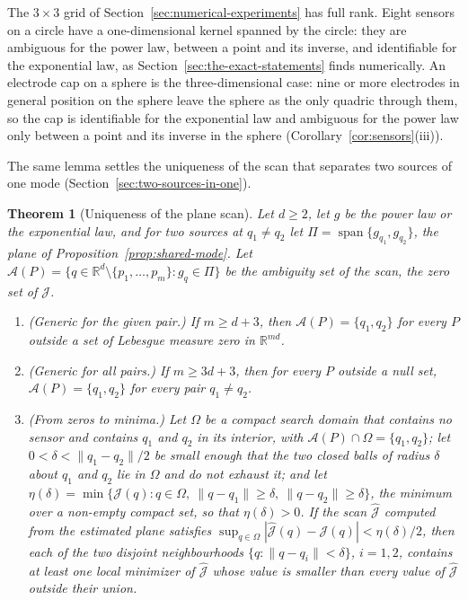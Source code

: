 \documentclass{article}
\newtheorem{theorem}{\bf Theorem}
\begin{document}
The $3 \times 3$ grid of Section~\ref{sec:numerical-experiments} has full rank. Eight sensors on a circle have a one-dimensional kernel spanned by the circle: they are ambiguous for the power law, between a point and its inverse, and identifiable for the exponential law, as Section~\ref{sec:the-exact-statements} finds numerically. An electrode cap on a sphere is the three-dimensional case: nine or more electrodes in general position on the sphere leave the sphere as the only quadric through them, so the cap is identifiable for the exponential law and ambiguous for the power law only between a point and its inverse in the sphere (Corollary~\ref{cor:sensors}(iii)).

The same lemma settles the uniqueness of the scan that separates two sources of one mode (Section~\ref{sec:two-sources-in-one}).

\begin{theorem}[Uniqueness of the plane scan] \label{thm:plane-scan}
Let $d \ge 2$, let $g$ be the power law or the exponential law, and for two sources at $q_1 \ne q_2$ let $\Pi = \operatorname{span}\{g_{q_1}, g_{q_2}\}$, the plane of Proposition~\ref{prop:shared-mode}. Let $\mathcal{A}(P) = \{ q \in \mathbb{R}^{d} \setminus \{p_1, \dots, p_m\} : g_q \in \Pi \}$ be the ambiguity set of the scan, the zero set of $\mathcal{J}$.
\begin{enumerate}
\renewcommand{\labelenumi}{(\alph{enumi})}
\item (Generic for the given pair.) If $m \ge d + 3$, then $\mathcal{A}(P) = \{q_1, q_2\}$ for every $P$ outside a set of Lebesgue measure zero in $\mathbb{R}^{md}$.
\item (Generic for all pairs.) If $m \ge 3d + 3$, then for every $P$ outside a null set, $\mathcal{A}(P) = \{q_1, q_2\}$ for every pair $q_1 \ne q_2$.
\item (From zeros to minima.) Let $\Omega$ be a compact search domain that contains no sensor and contains $q_1$ and $q_2$ in its interior, with $\mathcal{A}(P) \cap \Omega = \{q_1, q_2\}$; let $0 < \delta < \lVert q_1 - q_2 \rVert/2$ be small enough that the two closed balls of radius $\delta$ about $q_1$ and $q_2$ lie in $\Omega$ and do not exhaust it; and let $\eta(\delta) = \min\{ \mathcal{J}(q) : q \in \Omega,\ \lVert q - q_1 \rVert \ge \delta,\ \lVert q - q_2 \rVert \ge \delta \}$, the minimum over a non-empty compact set, so that $\eta(\delta) > 0$. If the scan $\widehat{\mathcal{J}}$ computed from the estimated plane satisfies $\sup_{q \in \Omega} |\widehat{\mathcal{J}}(q) - \mathcal{J}(q)| < \eta(\delta)/2$, then each of the two disjoint neighbourhoods $\{q : \lVert q - q_i \rVert < \delta\}$, $i = 1, 2$, contains at least one local minimizer of $\widehat{\mathcal{J}}$ whose value is smaller than every value of $\widehat{\mathcal{J}}$ outside their union.
\end{enumerate}
\end{theorem}
\end{document}
